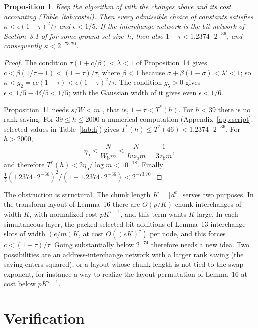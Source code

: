\documentclass[11pt]{article}
\numberwithin{equation}{section}
\numberwithin{table}{section}
\newtheorem{proposition}[theorem]{Proposition}
\theoremstyle{remark}
\newcommand{\OAI}{\cite{OAI}}
\newcommand{\Wb}{W_{\mathrm b}}
\newcommand{\zb}{z_{\mathrm b}}
\newcommand{\etab}{\eta_{\mathrm b}}
\begin{document}
\begin{proposition}\label{prop:barrier}
Keep the algorithm of \OAI{} with the changes above and its cost
accounting (Table~\ref{tab:costs}). Then every admissible choice of
constants satisfies $\kappa<\epsilon(1-\tau)^2/\tau$ and
$\epsilon<1/5$. If the interchange network is the bit network of
Section~3.1 of \OAI{} for some ground-set size~$h$, then also
$1-\tau<1.2374\cdot2^{-36}$, and consequently $\kappa<2^{-73.70}$.
\end{proposition}

\begin{proof}
The condition $\tau(1+c/\beta)<\lambda<1$ of Proposition~14 gives
$c<\beta(1/\tau-1)<(1-\tau)/\tau$, where $\beta<1$ because
$\sigma+\beta(1-\sigma)<\lambda'<1$; so $\kappa<g_2=\epsilon
c(1-\tau)<\epsilon(1-\tau)^2/\tau$. The condition $g_5>0$ gives
$\epsilon<1/5-4\delta/5<1/5$; with the Gaussian width of \OAI{} it gives
even $\epsilon<1/6$.

Proposition~11 needs $s/W<m^\tau$, that is, $1-\tau<T^*(h)$. For $h<39$
there is no rank saving. For $39\le h\le2000$ a numerical computation
(Appendix~\ref{app:script}; selected values in Table~\ref{tab:h}) gives $T^*(h)\le T^*(46)<1.2374\cdot2^{-36}$. For
$h>2000$,
\[
 \etab\le\frac{N}{\Wb m}\le\frac{N}{Iv\zb m}=\frac1{3\zb m},
\]
and therefore $T^*(h)<2\etab/\log m<10^{-18}$. Finally
$\tfrac15(1.2374\cdot2^{-36})^2/(1-1.2374\cdot2^{-36})<2^{-73.70}$.
\end{proof}

The obstruction is structural. The chunk length $K=\lfloor d^c\rfloor$
serves two purposes. In the transform layout of Lemma~16 there are
$O(p/K)$ chunk interchanges of width $K$, with normalized cost
$pK^{\tau-1}$, and this term wants $K$ large. In each simultaneous
layer, the packed selected-bit additions of Lemma~13 interchange slots
of width $(e/m)K$, at cost $O((eK)^\tau)$ per node, and this forces
$c<(1-\tau)/\tau$. Going substantially below $2^{-74}$ therefore needs a
new idea. Two possibilities are an address-interchange network with a
larger rank saving (the saving enters squared), or a layout whose chunk
length is not tied to the swap exponent, for instance a way to realize
the layout permutation of Lemma~16 at cost below $pK^{\tau-1}$.

\section{Verification}\label{sec:verification}
\end{document}
